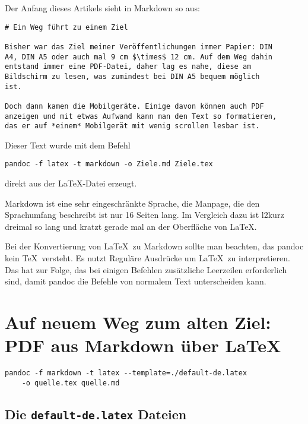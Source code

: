 \documentclass[11pt,ngerman,a4paper]{article}
\begin{document}
Der Anfang dieses Artikels sieht in Markdown so aus:

\begin{verbatim}
# Ein Weg führt zu einem Ziel

Bisher war das Ziel meiner Veröffentlichungen immer Papier: DIN
A4, DIN A5 oder auch mal 9 cm $\times$ 12 cm. Auf dem Weg dahin
entstand immer eine PDF-Datei, daher lag es nahe, diese am
Bildschirm zu lesen, was zumindest bei DIN A5 bequem möglich
ist.

Doch dann kamen die Mobilgeräte. Einige davon können auch PDF
anzeigen und mit etwas Aufwand kann man den Text so formatieren,
das er auf *einem* Mobilgerät mit wenig scrollen lesbar ist.
\end{verbatim}

Dieser Text wurde mit dem Befehl

\begin{verbatim}
pandoc -f latex -t markdown -o Ziele.md Ziele.tex
\end{verbatim}

direkt aus der LaTeX-Datei erzeugt.

Markdown ist eine sehr eingeschränkte Sprache, die Manpage, die den
Sprachumfang beschreibt ist nur 16 Seiten lang. Im Vergleich dazu ist
l2kurz dreimal so lang und kratzt gerade mal an der Oberfläche von
LaTeX.

Bei der Konvertierung von LaTeX~zu Markdown sollte man beachten, das
pandoc kein TeX~versteht. Es nutzt Reguläre Ausdrücke um LaTeX~zu
interpretieren. Das hat zur Folge, das bei einigen Befehlen zusätzliche
Leerzeilen erforderlich sind, damit pandoc die Befehle von normalem Text
unterscheiden kann.

\section{Auf neuem Weg zum alten Ziel: PDF aus Markdown über
LaTeX}\label{auf-neuem-weg-zum-alten-ziel-pdf-aus-markdown-uxfcber-latex}

\begin{verbatim}
pandoc -f markdown -t latex --template=./default-de.latex 
    -o quelle.tex quelle.md
\end{verbatim}

\subsection{Die \texttt{default-de.latex}
Dateien}\label{die-default-de.latex-dateien}
\end{document}
